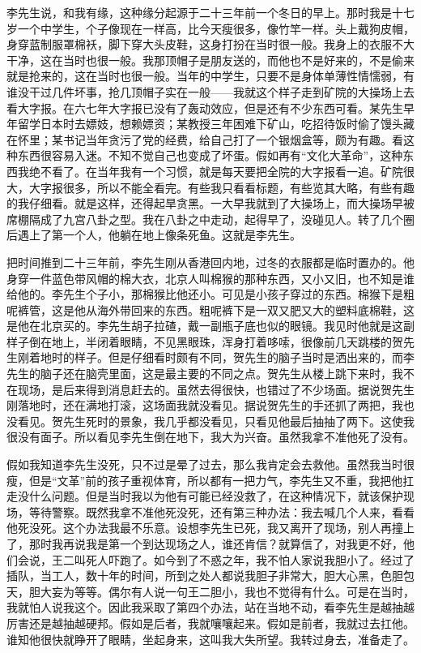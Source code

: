 李先生说，和我有缘，这种缘分起源于二十三年前一个冬日的早上。那时我是十七岁一个中学生，个子像现在一样高，比今天瘦很多，像竹竿一样。头上戴狗皮帽，身穿蓝制服罩棉袄，脚下穿大头皮鞋，这身打扮在当时很一般。我身上的衣服不大干净，这在当时也很一般。我那顶帽子是朋友送的，而他也不是好来的，不是偷来就是抢来的，这在当时也很一般。当年的中学生，只要不是身体单薄性情懦弱，有谁没干过几件坏事，抢几顶帽子实在一般——我就这个样子走到矿院的大操场上去看大字报。在六七年大字报已没有了轰动效应，但是还有不少东西可看。某先生早年留学日本时去嫖妓，想赖嫖资；某教授三年困难下矿山，吃招待饭时偷了馒头藏在怀里；某书记当年贪污了党的经费，给自己打了一个银烟盒等，颇为有趣。看这种东西很容易入迷。不知不觉自己也变成了坏蛋。假如再有“文化大革命”，这种东西我绝不看了。在当年我有一个习惯，就是每天要把全院的大字报看一追。矿院很大，大字报很多，所以不能全看完。有些我只看看标题，有些览其大略，有些有趣的我仔细看。就是这样，还得起旱贪黑。一大早我就到了大操场上，而大操场早被席棚隔成了九宫八卦之型。我在八卦之中走动，起得早了，没碰见人。转了几个圈后遇上了第一个人，他躺在地上像条死鱼。这就是李先生。 

把时间推到二十三年前，李先生刚从香港回内地，过冬的衣服都是临时置办的。他身穿一件蓝色带风帽的棉大衣，北京人叫棉猴的那种东西，又小又旧，也不知是谁给他的。李先生个子小，那棉猴比他还小。可见是小孩子穿过的东西。棉猴下是粗呢裤管，这是他从海外带回来的东西。粗呢裤下是一双又肥又大的塑料底棉鞋，这是他在北京买的。李先生胡子拉碴，戴一副瓶子底也似的眼镜。我见时他就是这副样子倒在地上，半闭着眼睛，不见黑眼珠，浑身打着哆嗦，很像前几天跳楼的贺先生刚着地时的样子。但是仔细看时颇有不同，贺先生的脑子当时是洒出来的，而李先生的脑子还在脑壳里面，这是最主要的不同之点。贺先生从楼上跳下来时，我不在现场，是后来得到消息赶去的。虽然去得很快，也错过了不少场面。据说贺先生刚落地时，还在满地打滚，这场面我就没看见。据说贺先生的手还抓了两把，我也没看见。贺先生死时的景象，我几乎都没看见，只看见他最后抽抽了两下。这使我很没有面子。所以看见李先生倒在地下，我大为兴奋。虽然我拿不准他死了没有。 

假如我知道李先生没死，只不过是晕了过去，那么我肯定会去救他。虽然我当时很瘦，但是“文革”前的孩子重视体育，所以都有一把力气，李先生又不重，我把他扛走没什么问题。但是当时我以为他有可能已经没救了，在这种情况下，就该保护现场，等待警察。既然我拿不准他死没死，还有第三种办法：我去喊几个人来，看看他死没死。这个办法我最不乐意。设想李先生已死，我又离开了现场，别人再撞上了，那时我再说我是第一个到达现场之人，谁还肯信？就算信了，对我更不好，他们会说，王二叫死人吓跑了。如今到了不惑之年，我不怕人家说我胆小了。经过了插队，当工人，数十年的时间，所到之处人都说我胆子非常大，胆大心黑，色胆包天，胆大妄为等等。偶尔有人说一句王二胆小，我也不觉得有什么。可是在当时，我就怕人说我这个。因此我采取了第四个办法，站在当地不动，看李先生是越抽越厉害还是越抽越硬邦。假如是后者，我就嚷嚷起来。假如是前者，我就过去扛他。谁知他很快就睁开了眼睛，坐起身来，这叫我大失所望。我转过身去，准备走了。 

